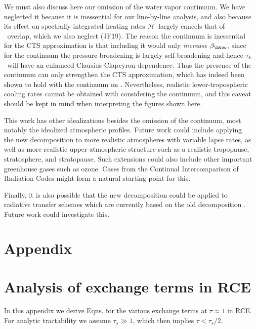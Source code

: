 \documentclass[10pt]{article}
\newcommand{\ch}{\ensuremath{\mathcal{H}}}
\newcommand{\tauk}{\ensuremath{\tau_k}}
\newcommand{\taus}{\ensuremath{\tau_s}}
\begin{document}
We must also discuss here our omission of the water vapor continuum. We have neglected it  
 because it is inessential for our line-by-line analysis, and also because its effect on spectrally integrated heating rates \ch\ largely cancels that of \cotwo\ overlap, which we also neglect (JF19). The reason the continuum is inessential for the CTS approximation is that including it would only \emph{increase} $\beta_{\htwo}$, since for the continuum the pressure-broadening is largely self-broadening and hence \tauk\ will have an enhanced Clausius-Clapeyron dependence. Thus the presence of the continuum can only strengthen the CTS approximation, which has indeed been shown to hold  with the continuum on \citep{clough1992}.  Nevertheless, realistic lower-tropospheric cooling rates cannot be obtained with considering the continuum, and this caveat should be kept in mind when interpreting the figures shown here.

This work has other idealizations besides the omission of the continuum, most notably the idealized atmospheric profiles. Future work could include applying the new decomposition  to more realistic atmospheres with variable lapse rates, as well as more realistic upper-atmospheric structure such as a realistic tropopause, stratosphere, and stratopause. Such extensions could also include other important greenhouse gases such as ozone. Cases from the Continual Intercomparison of Radiation Codes \citep[CIRC;][]{oreopoulos2010} might form a natural starting point for this.

Finally, it is also possible that the new decomposition could be applied to radiative transfer schemes which are currently based on the old decomposition \citep[e.g.][]{schwarzkopf1991,fels1975}. Future work could investigate this.


\section*{Appendix}
\appendix

\section{Analysis of exchange terms in RCE} \label{appendix_cts}
In this appendix we derive Eqns.  for the various exchange terms at $\tau\approx1$ in RCE. For analytic tractability we assume $\taus \gg 1$, which then implies $\tau < \taus/2$.
\end{document}
